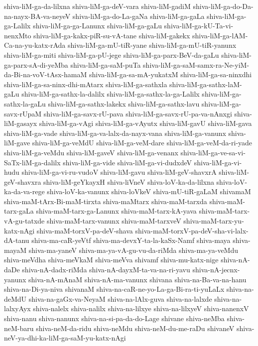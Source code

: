 {shiva-liM-ga-da-lilxna
shiva-liM-ga-deV-vara
shiva-liM-gadiM
shiva-liM-ga-do-Da-na-nayx-BA-va-neyeV
shiva-liM-ga-do-La-gaNa
shiva-liM-ga-gaLa
shiva-liM-ga-ga-Lalilx
shiva-liM-ga-ga-Lanunx
shiva-liM-ga-gaLu
shiva-liM-ga-kU-Ta-vi-nenxMto
shiva-liM-ga-kakx-piR-su-vA-tane
shiva-liM-gakekx
shiva-liM-ga-lAM-Ca-na-yu-katx-rAda
shiva-liM-ga-mU-tiR-yane
shiva-liM-ga-mU-tiR-yanunx
shiva-liM-ga-miti
shiva-liM-ga-pU-jege
shiva-liM-ga-parx-BeV-da-gaLu
shiva-liM-ga-parx-sA-di-yeMba
shiva-liM-ga-saM-puTa
shiva-liM-ga-saM-samx-ra-Ne-yiM-da-Bi-na-voV-tAsx-hamaM
shiva-liM-ga-sa-mA-yukatxM
shiva-liM-ga-sa-ninxdhi
shiva-liM-ga-sa-ninx-dhi-mAtarx
shiva-liM-ga-sathxla
shiva-liM-ga-sathx-laM-gaLu
shiva-liM-ga-sathx-la-dalilx
shiva-liM-ga-sathx-la-ga-Lalilx
shiva-liM-ga-sathx-la-gaLu
shiva-liM-ga-sathx-lakekx
shiva-liM-ga-sathx-lavu
shiva-liM-ga-savx-rUpaM
shiva-liM-ga-savx-rU-pava
shiva-liM-ga-savx-rU-pa-va-nAnxgi
shiva-liM-gasayx
shiva-liM-ga-vAgi
shiva-liM-ga-vAyutx
shiva-liM-gavU
shiva-liM-gava
shiva-liM-ga-vade
shiva-liM-ga-va-lalx-da-nayx-vana
shiva-liM-ga-vanunx
shiva-liM-gave
shiva-liM-ga-veMdU
shiva-liM-ga-veM-dare
shiva-liM-ga-veM-da-ri-yade
shiva-liM-ga-veMdu
shiva-liM-gaveV
shiva-liM-ga-venanx
shiva-liM-ga-ve-sa-vi-SaTx-liM-ga-dalilx
shiva-liM-ga-vide
shiva-liM-ga-vi-dudxdeV
shiva-liM-ga-vi-hudu
shiva-liM-ga-vi-ru-vudoV
shiva-liM-gavu
shiva-liM-geV-shavxrA
shiva-liM-geV-shavxra
shiva-liM-geYkayxH
shiva-liVneV
shiva-loV-ka-da-lilxna
shiva-loV-ka-da-va-rege
shiva-loV-ka-vanunx
shiva-loVkeV
shiva-mU-tiR-gaLaM
shivamaM
shiva-maM-tArx-Bi-maM-tirxta
shiva-maMtarx
shiva-maM-tarxda
shiva-maM-tarx-gaLa
shiva-maM-tarx-ga-Lanunx
shiva-maM-tarx-kA-yava
shiva-maM-tarx-vA-gu-tatxde
shiva-maM-tarx-vanunx
shiva-maM-tarxveV
shiva-maM-tarx-yu-katx-nAgi
shiva-maM-torxV-pa-deV-shava
shiva-maM-torxV-pa-deV-sha-vi-lalx-dA-tanu
shiva-ma-caR-yeVtf
shiva-ma-devxY-ta-la-kaSx-Namf
shiva-maya
shiva-mayaM
shiva-ma-yaneV
shiva-ma-ya-vA-gu-vu-da-riMda
shiva-ma-ya-veMdu
shiva-meVdha
shiva-meVkaM
shiva-meVva
shivamf
shiva-mu-katx-nige
shiva-nA-daDe
shiva-nA-dadx-riMda
shiva-nA-dayxM-ta-va-na-ri-yavu
shiva-nA-jecnx-yanunx
shiva-nA-mAnaM
shiva-nA-ma-vanunx
shivana
shiva-na-Ba-va-na-hanu
shiva-na-Di-ya-niva
shivanaM
shiva-na-caR-ne-yo-La-ga-Bi-ra-ti-yuLaLx
shiva-na-deMdU
shiva-na-gaGx-va-NeyaM
shiva-na-lAlx-guva
shiva-na-lalxde
shiva-na-lalxyAyx
shiva-nalelx
shiva-nalilx
shiva-na-lilxye
shiva-na-lilxyeV
shiva-nanenxV
shiva-nanu
shiva-nanunx
shiva-na-si-pa-da-do-Lage
shivane
shiva-neMba
shiva-neM-baru
shiva-neM-da-ridu
shiva-neMdu
shiva-neM-du-me-raDu
shivaneV
shiva-neV-ya-dhi-ka-liM-ga-saM-yu-katx-nAgi
}
